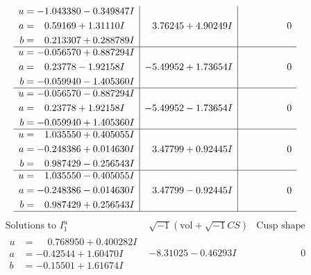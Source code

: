 \documentclass[1p]{elsarticle_modified}
\theoremstyle{definition}
\newcommand{\I}{\sqrt{-1}}
\begin{document}
$$\begin{array}{c|c|c}
\begin{aligned}
u &= -1.043380 - 0.349847 I \\
a &= \phantom{-}0.59169 + 1.31110 I \\
b &= \phantom{-}0.213307 + 0.288789 I\end{aligned}
 & \phantom{-}3.76245 + 4.90249 I & \phantom{-0.000000 } 0 \\ \hline\begin{aligned}
u &= -0.056570 + 0.887294 I \\
a &= \phantom{-}0.23778 - 1.92158 I \\
b &= -0.059940 - 1.405360 I\end{aligned}
 & -5.49952 + 1.73654 I & \phantom{-0.000000 } 0 \\ \hline\begin{aligned}
u &= -0.056570 - 0.887294 I \\
a &= \phantom{-}0.23778 + 1.92158 I \\
b &= -0.059940 + 1.405360 I\end{aligned}
 & -5.49952 - 1.73654 I & \phantom{-0.000000 } 0 \\ \hline\begin{aligned}
u &= \phantom{-}1.035550 + 0.405055 I \\
a &= -0.248386 + 0.014630 I \\
b &= \phantom{-}0.987429 - 0.256543 I\end{aligned}
 & \phantom{-}3.47799 + 0.92445 I & \phantom{-0.000000 } 0 \\ \hline\begin{aligned}
u &= \phantom{-}1.035550 - 0.405055 I \\
a &= -0.248386 - 0.014630 I \\
b &= \phantom{-}0.987429 + 0.256543 I\end{aligned}
 & \phantom{-}3.47799 - 0.92445 I & \phantom{-0.000000 } 0\\
 \hline 
 \end{array}$$\newpage$$\begin{array}{c|c|c}  
\text{Solutions to }I^u_{1}& \I (\text{vol} + \sqrt{-1}CS) & \text{Cusp shape}\\
 \hline 
\begin{aligned}
u &= \phantom{-}0.768950 + 0.400282 I \\
a &= -0.42544 + 1.60470 I \\
b &= -0.15501 + 1.61674 I\end{aligned}
 & -8.31025 - 0.46293 I & \phantom{-0.000000 } 0 \\ \hline\begin{aligned}

\end{aligned}
\end{array}$$
\end{document}
